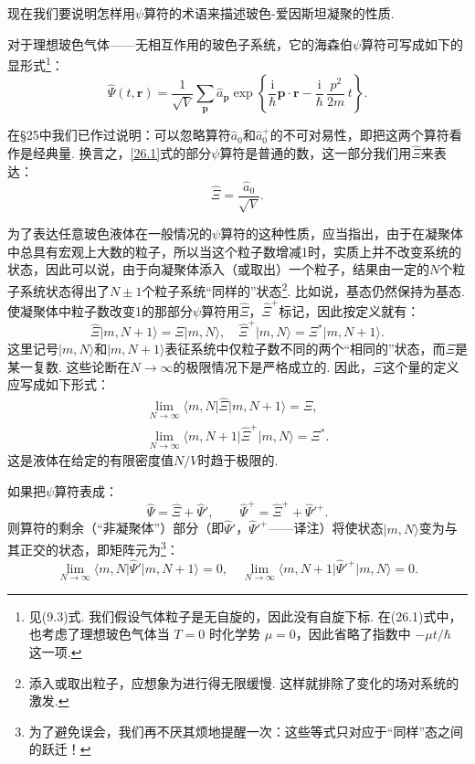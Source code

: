 现在我们要说明怎样用$\psi$算符的术语来描述玻色-爱因斯坦凝聚的性质.

对于理想玻色气体——无相互作用的玻色子系统，它的海森伯$\psi$算符可写成如下的显形式\footnote{见(9.3)式. 我们假设气体粒子是无自旋的，因此没有自旋下标. 在(26.1)式中，也考虑了理想玻色气体当 $T=0$ 时化学势 $\mu=0$，因此省略了指数中 $-\mu t/\hbar$ 这一项.}：
\begin{equation}
\hat{\Psi}(t,\bm{r})=\frac{1}{\sqrt{V}}\sum_{\bm{p}}\hat{a}_{\bm{p}}
\exp\left\{\frac{\mathrm{i}}{\hbar}\bm{p}\cdot\bm{r}
-\frac{\mathrm{i}}{\hbar}\,\frac{p^{2}}{2m}\,t\right\}.
\label{26.1}
\end{equation}

在§25中我们已作过说明：可以忽略算符$\hat{a}_{0}$和$\hat{a}^{+}_{0}$的不可对易性，即把这两个算符看作是经典量. 换言之，\eqref{26.1}式的部分$\psi$算符是普通的数，这一部分我们用$\hat{\Xi}$来表达：
\begin{equation}
\hat{\Xi}=\frac{\hat{a}_{0}}{\sqrt{V}}.
\label{26.2}
\end{equation}

为了表达任意玻色液体在一般情况的$\psi$算符的这种性质，应当指出，由于在凝聚体中总具有宏观上大数的粒子，所以当这个粒子数增减1时，实质上并不改变系统的状态，因此可以说，由于向凝聚体添入（或取出）一个粒子，结果由一定的$N$个粒子系统状态得出了$N\pm 1$个粒子系统“同样的”状态\footnote{添入或取出粒子，应想象为进行得无限缓慢. 这样就排除了变化的场对系统的激发.}. 比如说，基态仍然保持为基态. 使凝聚体中粒子数改变1的那部分$\psi$算符用$\hat{\Xi}$，$\hat{\Xi}^{+}$标记，因此按定义就有：
\begin{equation*}
\hat{\Xi}\vert m,N+1\rangle=\Xi\vert m,N\rangle,\quad
\hat{\Xi}^{+}\vert m,N\rangle=\Xi^{*}\vert m,N+1\rangle.
\end{equation*}
这里记号$\vert m,N\rangle$和$\vert m,N+1\rangle$表征系统中仅粒子数不同的两个“相同的”状态，而$\Xi$是某一复数. 这些论断在$N\to\infty$的极限情况下是严格成立的. 因此，$\Xi$这个量的定义应写成如下形式：
\begin{equation}
\begin{gathered}
\lim_{N\to\infty}\langle m,N\vert\hat{\Xi}\vert m,N+1\rangle=\Xi,\\
\lim_{N\to\infty}\langle m,N+1\vert\hat{\Xi}^{+}\vert m,N\rangle=\Xi^{*}.
\end{gathered}
\label{26.3}
\end{equation}
这是液体在给定的有限密度值$N/V$时趋于极限的.

如果把$\psi$算符表成：
\begin{equation}
\hat{\Psi}=\hat{\Xi}+\hat{\Psi}',\qquad
\hat{\Psi}^{+}=\hat{\Xi}^{+}+\hat{\Psi}'^{+}.
\label{26.4}
\end{equation}
则算符的剩余（“非凝聚体”）部分（即$\hat{\Psi}'$，$\hat{\Psi}'^{+}$——译注）将使状态$\vert m,N\rangle$变为与其正交的状态，即矩阵元为\footnote{为了避免误会，我们再不厌其烦地提醒一次：这些等式只对应于“同样”态之间的跃迁！}：
\begin{equation}
\lim_{N\to\infty}\langle m,N\vert\hat{\Psi}'\vert m,N+1\rangle=0,\quad
\lim_{N\to\infty}\langle m,N+1\vert\hat{\Psi}'^{+}\vert m,N\rangle=0.
\label{26.5}
\end{equation}

